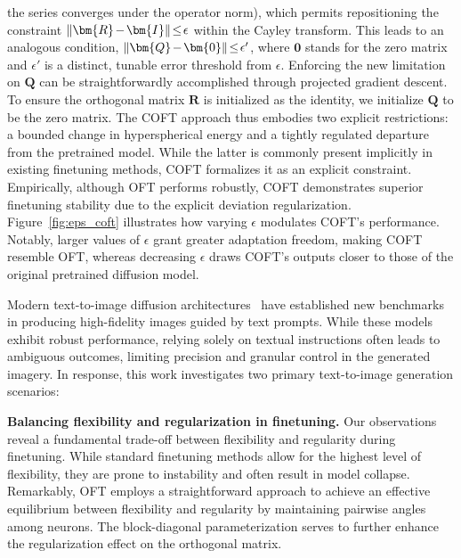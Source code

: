 \begin{itemize}[leftmargin=*,nosep]
the series converges under the operator norm), which permits repositioning the constraint $\thickmuskip=2mu \medmuskip=2mu\|\bm{R}-\bm{I}\|\leq\epsilon$ within the Cayley transform. This leads to an analogous condition, $\thickmuskip=2mu \medmuskip=2mu \|\bm{Q}-\bm{0}\|\leq\epsilon'$, where $\bm{0}$ stands for the zero matrix and $\epsilon'$ is a distinct, tunable error threshold from $\epsilon$. Enforcing the new limitation on $\bm{Q}$ can be straightforwardly accomplished through projected gradient descent. To ensure the orthogonal matrix $\bm{R}$ is initialized as the identity, we initialize $\bm{Q}$ to be the zero matrix. The COFT approach thus embodies two explicit restrictions: a bounded change in hyperspherical energy and a tightly regulated departure from the pretrained model. While the latter is commonly present implicitly in existing finetuning methods, COFT formalizes it as an explicit constraint. Empirically, although OFT performs robustly, COFT demonstrates superior finetuning stability due to the explicit deviation regularization. Figure~\ref{fig:eps_coft} illustrates how varying $\epsilon$ modulates COFT's performance. Notably, larger values of $\epsilon$ grant greater adaptation freedom, making COFT resemble OFT, whereas decreasing $\epsilon$ draws COFT's outputs closer to those of the original pretrained diffusion model.

Modern text-to-image diffusion architectures~\cite{saharia2022photorealistic,ramesh2022hierarchical,rombach2022high} have established new benchmarks in producing high-fidelity images guided by text prompts. While these models exhibit robust performance, relying solely on textual instructions often leads to ambiguous outcomes, limiting precision and granular control in the generated imagery. In response, this work investigates two primary text-to-image generation scenarios:

\textbf{Balancing flexibility and regularization in finetuning.} Our observations reveal a fundamental trade-off between flexibility and regularity during finetuning. While standard finetuning methods allow for the highest level of flexibility, they are prone to instability and often result in model collapse. Remarkably, OFT employs a straightforward approach to achieve an effective equilibrium between flexibility and regularity by maintaining pairwise angles among neurons. The block-diagonal parameterization serves to further enhance the regularization effect on the orthogonal matrix.


\end{itemize}
